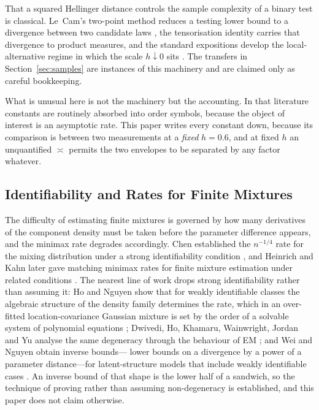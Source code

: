 That a squared Hellinger distance controls the sample complexity of a binary test is
classical. Le~Cam's two-point method reduces a testing lower bound to a divergence between
two candidate laws \cite{lecam1973}, the tensorisation identity carries that divergence to
product measures, and the standard expositions develop the local-alternative regime in which
the scale $h\downarrow0$ sits \cite{tsybakov2009,ibragimov1981}. The transfers in
Section~\ref{sec:samples} are instances of this machinery and are claimed only as careful
bookkeeping.

What is unusual here is not the machinery but the accounting. In that literature constants
are routinely absorbed into order symbols, because the object of interest is an asymptotic
rate. This paper writes every constant down, because its comparison is between two
measurements at a \emph{fixed} $h=0.6$, and at fixed $h$ an unquantified $\asymp$ permits
the two envelopes to be separated by any factor whatever.

\subsection{Identifiability and Rates for Finite Mixtures}

The difficulty of estimating finite mixtures is governed by how many derivatives of the
component density must be taken before the parameter difference appears, and the minimax
rate degrades accordingly. Chen established the $n^{-1/4}$ rate for the mixing distribution
under a strong identifiability condition \cite{chen1995}, and Heinrich and Kahn later gave
matching minimax rates for finite mixture estimation under related conditions
\cite{heinrich2018}. The nearest line of work drops strong identifiability rather than
assuming it: Ho and Nguyen show that for weakly identifiable classes the algebraic structure
of the density family determines the rate, which in an over-fitted location-covariance
Gaussian mixture is set by the order of a solvable system of polynomial equations
\cite{ho2015}; Dwivedi, Ho, Khamaru, Wainwright, Jordan and Yu analyse the same degeneracy
through the behaviour of EM \cite{dwivedi2019}; and Wei and Nguyen obtain inverse bounds---%
lower bounds on a divergence by a power of a parameter distance---for latent-structure
models that include weakly identifiable cases \cite{wei2020}. An inverse bound of that shape
is the lower half of a sandwich, so the technique of proving rather than assuming
non-degeneracy is established, and this paper does not claim otherwise.


